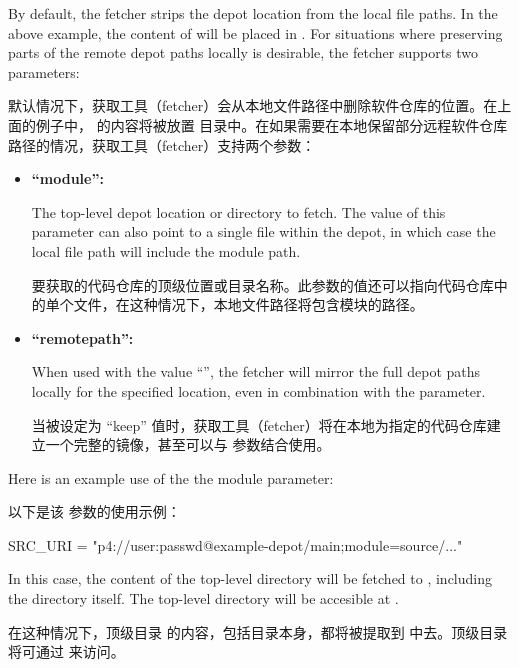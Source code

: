By default, the fetcher strips the depot location from the local file paths. In the above example, the content of  will be placed in . For situations where preserving parts of the remote depot paths locally is desirable, the fetcher supports two parameters:

默认情况下，获取工具（fetcher）会从本地文件路径中删除软件仓库的位置。在上面的例子中， 的内容将被放置  目录中。在如果需要在本地保留部分远程软件仓库路径的情况，获取工具（fetcher）支持两个参数：

\begin{itemize}
\setlength\itemsep{1.0em}
\item \textbf{``module'':}\par
The top-level depot location or directory to fetch. The value of this parameter can also point to a single file within the depot, in which case the local file path will include the module path.

\medskip
要获取的代码仓库的顶级位置或目录名称。此参数的值还可以指向代码仓库中的单个文件，在这种情况下，本地文件路径将包含模块的路径。

\item \textbf{``remotepath'':}\par
When used with the value ``'', the fetcher will mirror the full depot paths locally for the specified location, even in combination with the  parameter.

\medskip
当被设定为 ``keep'' 值时，获取工具（fetcher）将在本地为指定的代码仓库建立一个完整的镜像，甚至可以与  参数结合使用。
\end{itemize}

Here is an example use of the the module parameter:

以下是该  参数的使用示例：

\begin{pyglist}
SRC_URI = "p4://user:passwd@example-depot/main;module=source/..."
\end{pyglist}

In this case, the content of the top-level directory  will be fetched to , including the directory itself. The top-level directory will be accesible at .

在这种情况下，顶级目录  的内容，包括目录本身，都将被提取到  中去。顶级目录将可通过  来访问。

